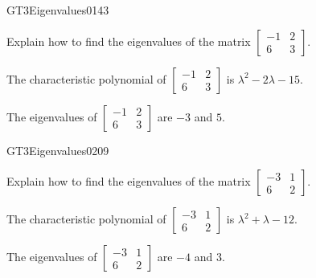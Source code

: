 \newpage




\begin{exercise}{GT3}{Eigenvalues}{0143} 
\begin{exerciseStatement} 

Explain how to find the eigenvalues of the matrix \(\left[\begin{array}{cc}
-1 & 2 \\
6 & 3
\end{array}\right]\).

 \end{exerciseStatement}
 \begin{exerciseAnswer} 

The characteristic polynomial of \(\left[\begin{array}{cc}
-1 & 2 \\
6 & 3
\end{array}\right]\) is \(\lambda^{2} - 2 \lambda - 15\).

 

The eigenvalues of \(\left[\begin{array}{cc}
-1 & 2 \\
6 & 3
\end{array}\right]\) are \(-3\) and \(5\).

 \end{exerciseAnswer}
 \end{exercise}



\begin{exercise}{GT3}{Eigenvalues}{0209} 
\begin{exerciseStatement} 

Explain how to find the eigenvalues of the matrix \(\left[\begin{array}{cc}
-3 & 1 \\
6 & 2
\end{array}\right]\).

 \end{exerciseStatement}
 \begin{exerciseAnswer} 

The characteristic polynomial of \(\left[\begin{array}{cc}
-3 & 1 \\
6 & 2
\end{array}\right]\) is \(\lambda^{2} + \lambda - 12\).

 

The eigenvalues of \(\left[\begin{array}{cc}
-3 & 1 \\
6 & 2
\end{array}\right]\) are \(-4\) and \(3\).

 \end{exerciseAnswer}
 \end{exercise}


